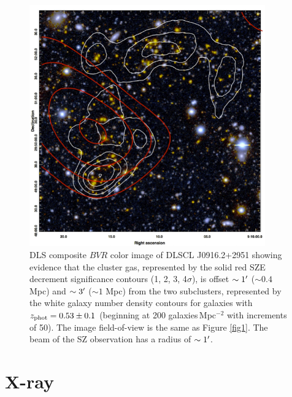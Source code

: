 \begin{figure}
\centering
\includegraphics[width=4in]{Chapter2/color_2contours_noblue_edit.png}
\caption[DLS optical image with SZE and galaxy number density maps.]{DLS composite $BVR$ color image of DLSCL J0916.2+2951 showing evidence that the cluster gas, represented by the solid red SZE decrement significance contours (1, 2, 3, 4$\sigma$), is offset $\sim1\mbox{$^\prime$}$ ($\sim0.4$ Mpc) and $\sim3\mbox{$^\prime$}$ ($\sim1$ Mpc) from the two subclusters, represented by the white galaxy number density contours for galaxies with $z_{\rm phot}=0.53\pm0.1$ (beginning at 200 galaxies\,Mpc$^{-2}$ with increments of 50). 
The image field-of-view is the same as Figure \ref{fig1}. 
The beam of the SZ observation has a radius of $\sim1\mbox{$^\prime$}$.\label{figure:MusketBallSZ}}
\end{figure}

\section{X-ray}

